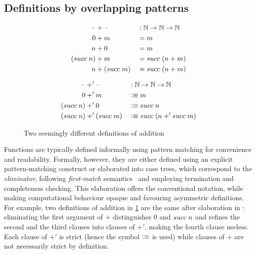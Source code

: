 \documentclass[a4paper,UKenglish,numberwithinsect,cleveref,thm-restate]{lipics-v2021}
\begin{document}
\subsection{Definitions by overlapping patterns} \label{sec:meta:overlapping}
\begin{figure} 
\begin{minipage}[t]{.48\textwidth}
  \begin{alignat*}{5}
    \blank  & + \blank     && : \N \to \N \to \N \\
    0       &  + m         && = m  \\
  n         &  + 0         && = m  \\
  (\suc\;n) &  + m         && = \suc\;(n + m) \\
  n         &  + (\suc\;m) && = \suc\;(n + m)
\end{alignat*}
\end{minipage}
\begin{minipage}[t]{.5\textwidth}
\begin{alignat*}{5}
  \blank         & +'\blank     && : \N \to \N \to \N \\
  0              & +' m         && \defeq m  \\
  (\suc\;n)      & +' 0         && \defeq \suc\;n \\
  (\suc\;n)      & +' (\suc\;m) && \defeq \suc\;(n +' \suc\;m)
\end{alignat*}
\end{minipage}
\caption{Two seemingly different definitions of addition}
\label{fig:additions}
\end{figure}
Functions are typically defined informally using pattern matching for convenience and readability. Formally, however, they are either defined using an explicit pattern-matching construct or elaborated into case trees, which correspond to the \emph{eliminator}, following \emph{first-match} semantics~\cite{Cockx2020a} and employing termination and completeness checking.
This elaboration offers the conventional notation, while making computational behaviour opaque and favouring asymmetric definitions.
For example, two definitions of addition in \cref{fig:additions} are the same
after elaboration in \Agda: eliminating the first argument of $+$ distinguishes $0$ and $\suc\;n$ and refines the second and the third clauses into clauses of $+'$, making the fourth clause useless.
Each clause of $+'$ is strict (hence the symbol $\vcentcolon\equiv$ is used) while clauses of $+$ are not necessarily strict by definition.
\end{document}
